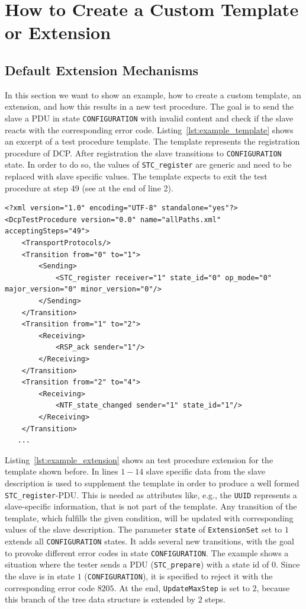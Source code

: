 \documentclass[a4paper]{scrartcl}
\theoremstyle{definition}
\begin{document}
\section{How to Create a Custom Template or Extension}
\label{sec:custom}

\subsection{Default Extension Mechanisms}
\label{sec:default_extension_mechanisms}
In this section we want to show an example, how to create a custom template, an extension, and how this results in a new test procedure.
The goal is to send the slave a PDU in state \texttt{CONFIGURATION}  with invalid content and check if the slave reacts with the corresponding error code.
Listing~\ref{lst:example_template} shows an excerpt of a test procedure template.
The template represents the registration procedure of DCP.
After registration the slave transitions to \texttt{CONFIGURATION} state.
In order to do so, the values of \texttt{STC\_register} are generic and need to be replaced with slave specific values.
The template expects to exit the test procedure at step 49 (see at the end of line 2).

\lstset{language=xml, numbers=left, numberstyle=\tiny, numbersep=10pt, frame=lines, captionpos=t, aboveskip=10pt, belowskip=10pt}
\begin{lstlisting}[caption=Snippet of a template, label=lst:example_template]
<?xml version="1.0" encoding="UTF-8" standalone="yes"?>
<DcpTestProcedure version="0.0" name="allPaths.xml" acceptingSteps="49">
    <TransportProtocols/>
    <Transition from="0" to="1">
        <Sending>
            <STC_register receiver="1" state_id="0" op_mode="0"  major_version="0" minor_version="0"/>
        </Sending>
    </Transition>
    <Transition from="1" to="2">
        <Receiving>
            <RSP_ack sender="1"/>
        </Receiving>
    </Transition>
    <Transition from="2" to="4">
        <Receiving>
            <NTF_state_changed sender="1" state_id="1"/>
        </Receiving>
    </Transition>
   ...
\end{lstlisting}

Listing~\ref{lst:example_extension} shows an test procedure extension for the template shown before.
In lines $1-14$ slave specific data from the slave description is used to supplement the template in order to produce a well formed \texttt{STC\_register}-PDU.
This is needed as attributes like, e.g., the \texttt{UUID} represents a slave-specific information, that is not part of the template.
Any transition of the template, which fulfills the given condition, will be updated with corresponding values of the slave description.
The parameter \texttt{state} of \texttt{ExtensionSet} set to $1$ extends all \texttt{CONFIGURATION} states.
It adds several new transitions, with the goal to provoke different error codes in state \texttt{CONFIGURATION}.
The example shows a situation where the tester sends a PDU (\texttt{STC\_prepare}) with a state id of $0$.
Since the slave is in state $1$ (\texttt{CONFIGURATION}), it is specified to reject it with the corresponding error code $8205$.
At the end, \texttt{UpdateMaxStep} is set to $2$, because this branch of the tree data structure is extended by $2$ steps.
\end{document}
